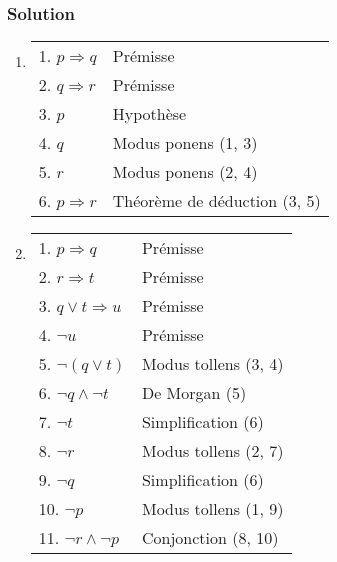     \subsubsection*{Solution}
    \begin{enumerate}
    
	\item  \hspace{1em}
    \begin{center}
    \begin{tabular}{|l|l|}
    \hline
    1. $p \Rightarrow q$ & Prémisse \\
    2. $q \Rightarrow r$ & Prémisse \\
    \hspace{0.5cm} 3. $p$ & Hypothèse \\
    \hspace{0.5cm} 4. $q$ & Modus ponens (1, 3) \\
    \hspace{0.5cm} 5. $r$ & Modus ponens (2, 4) \\ 
    6. $p \Rightarrow r$ & Théorème de déduction (3, 5) \\
    \hline
    \end{tabular}
    \end{center}
    
	\item  \hspace{1em}
    \begin{center}
    \begin{tabular}{|l|l|}
    \hline
    1. $p \Rightarrow q$ & Prémisse \\
    2. $r \Rightarrow t$ & Prémisse \\
    3. $q \lor t \Rightarrow u $ & Prémisse \\
    4. $\lnot u$ & Prémisse \\
    5. $\lnot (q \lor t)$ & Modus tollens (3, 4) \\ 
    6. $\lnot q \land \lnot t$ & De Morgan (5) \\
    7. $\lnot t$ & Simplification (6) \\
    8. $\lnot r$ & Modus tollens (2, 7) \\
    9. $\lnot q$ & Simplification (6) \\
    10. $\lnot p$ & Modus tollens (1, 9) \\
    11. $\lnot r \land \lnot p$ & Conjonction (8, 10) \\
    \hline
    \end{tabular}
    \end{center}
    

\end{enumerate}
